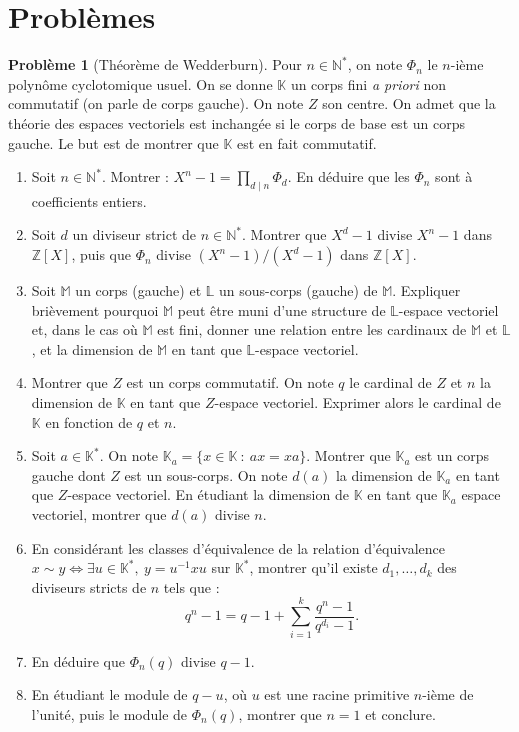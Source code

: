 \documentclass[french]{book}
\newcommand{\N}{\mathbb{N}}
\newcommand{\Z}{\mathbb{Z}}
\newcommand{\K}{\mathbb{K}}
\renewcommand{\L}{\mathbb{L}}
\newcommand{\st}{^*}
\newcommand{\inv}{^{-1}}
\theoremstyle{definition}
\newtheorem{pro}{Problème}[chapter]
\theoremstyle{remark}
\begin{document}
\section{Problèmes}

\begin{pro}[Théorème de Wedderburn]
	Pour $n\in\N\st$, on note $\Phi_n$ le $n$-ième polynôme cyclotomique usuel. On se donne $\K$ un corps fini \textit{a priori} non commutatif (on parle de corps gauche). On note $Z$ son centre. On admet que la théorie des espaces vectoriels est inchangée si le corps de base est un corps gauche. Le but est de montrer que $\K$ est en fait commutatif.
	\begin{enumerate}
		\item Soit $n\in\N\st$. Montrer : $X^n-1=\displaystyle\prod_{d\mid n}\Phi_d$. En déduire que les $\Phi_n$ sont à coefficients entiers.
		\item Soit $d$ un diviseur strict de $n\in\N\st$. Montrer que $X^d-1$ divise $X^n-1$ dans $\Z[X]$, puis que $\Phi_n$ divise $(X^n-1)/(X^d-1)$ dans $\Z[X]$.
		\item Soit $\mathbb{M}$ un corps (gauche) et $\L$ un sous-corps (gauche) de $\mathbb{M}$. Expliquer brièvement pourquoi $\mathbb{M}$ peut être muni d'une structure de $\L$-espace vectoriel et, dans le cas où $\mathbb{M}$ est fini, donner une relation entre les cardinaux de $\mathbb{M}$ et $\L$, et la dimension de $\mathbb{M}$ en tant que $\L$-espace vectoriel.
		\item Montrer que $Z$ est un corps commutatif. On note $q$ le cardinal de $Z$ et $n$ la dimension de $\K$ en tant que $Z$-espace vectoriel. Exprimer alors le cardinal de $\K$ en fonction de $q$ et $n$.
		\item Soit $a\in\K\st$. On note $\K_a=\{x\in\K\ :\ ax=xa\}$. Montrer que $\K_a$ est un corps gauche dont $Z$ est un sous-corps. On note $d(a)$ la dimension de $\K_a$ en tant que $Z$-espace vectoriel. En étudiant la dimension de $\K$ en tant que $\K_a$ espace vectoriel, montrer que $d(a)$ divise $n$.
		\item En considérant les classes d'équivalence de la relation d'équivalence $x\sim y\iff\exists u\in\K\st,\ y=u\inv xu$ sur $\K\st$, montrer qu'il existe $d_1,\ldots,d_k$ des diviseurs stricts de $n$ tels que :
		$$q^n-1=q-1+\sum_{i=1}^{k}\frac{q^n-1}{q^{d_i}-1}.$$
		\item En déduire que $\Phi_n(q)$ divise $q-1$.
		\item En étudiant le module de $q-u$, où $u$ est une racine primitive $n$-ième de l'unité, puis le module de $\Phi_n(q)$, montrer que $n=1$ et conclure.
	\end{enumerate}
\end{pro}
\end{document}
